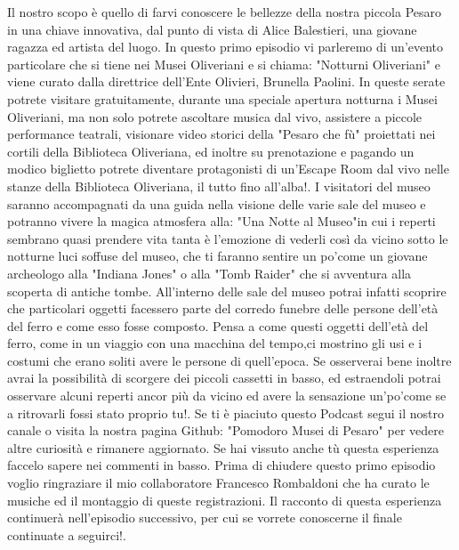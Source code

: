 \documentclass[hidelinks,12pt,a4paper]{article}
\begin{document}
\begin{flushleft}
		      Il nostro scopo è quello di farvi conoscere le bellezze della nostra piccola Pesaro in una chiave innovativa, dal punto di vista di Alice Balestieri, una giovane ragazza ed artista del luogo.
		      In questo primo episodio vi parleremo di un'evento particolare che si tiene nei Musei Oliveriani e si chiama: "Notturni Oliveriani" e viene curato dalla direttrice dell'Ente Olivieri, Brunella Paolini.
		      In queste serate potrete visitare gratuitamente, durante una speciale apertura notturna i Musei Oliveriani, ma non solo potrete ascoltare musica dal vivo, assistere a piccole performance teatrali, visionare video storici della "Pesaro che fù" proiettati nei cortili della Biblioteca Oliveriana, ed inoltre su prenotazione e pagando un modico biglietto potrete diventare protagonisti di un'Escape Room dal vivo nelle stanze della Biblioteca Oliveriana, il tutto fino all'alba!.
		      I visitatori del museo saranno accompagnati da una guida nella visione delle varie sale del museo e potranno vivere la magica atmosfera alla: "Una Notte al Museo"in cui i reperti sembrano quasi prendere vita tanta è l'emozione di vederli così da vicino sotto le notturne luci soffuse del museo, che ti faranno sentire un po'come un giovane archeologo alla "Indiana Jones" o alla "Tomb Raider" che si avventura alla scoperta di antiche tombe.
		      All'interno delle sale del museo potrai infatti scoprire che particolari oggetti facessero parte del corredo funebre delle persone dell'età del ferro e come esso fosse composto.
		      Pensa a come questi oggetti dell'età del ferro, come in un viaggio con una macchina del tempo,ci mostrino gli usi e i costumi che erano soliti avere le persone di quell'epoca.
		      Se osserverai bene inoltre avrai la possibilità di scorgere dei piccoli cassetti in basso, ed estraendoli potrai osservare alcuni  reperti ancor più da vicino ed avere la sensazione un'po'come se a ritrovarli fossi stato proprio tu!.
		      Se ti è piaciuto questo Podcast segui il nostro canale o visita la nostra pagina Github: "Pomodoro Musei di Pesaro" per vedere altre curiosità e rimanere aggiornato.
		      Se hai vissuto anche tù questa esperienza faccelo sapere nei commenti in basso.
		      Prima di chiudere questo primo episodio voglio ringraziare il mio collaboratore Francesco Rombaldoni che ha curato le musiche ed il montaggio di queste registrazioni.
		      Il racconto di questa esperienza continuerà nell'episodio successivo, per cui se vorrete conoscerne il finale continuate a seguirci!.
		      

\end{flushleft}
\end{document}
